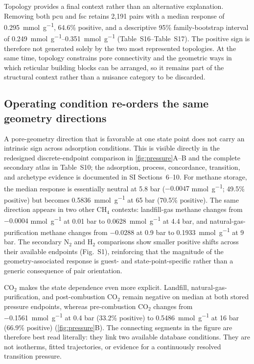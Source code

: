 \documentclass[11pt,a4paper]{article}
\newcommand{\SIfig}[1]{Fig.~S#1}
\newcommand{\SItab}[1]{Table~S#1}
\newcommand{\SIsecs}[1]{SI Sections~#1}
\begin{document}
Topology provides a final context rather than an alternative explanation.
Removing both pcu and fsc retains 2,191 pairs with a median response of
\SI{0.295}{\milli\mole\per\gram}, 64.6\% positive, and a descriptive 95\%
family-bootstrap interval of
\SIrange{0.249}{0.351}{\milli\mole\per\gram} (\SItab{16}--\SItab{17}).
The positive sign is therefore not generated solely by the two most represented
topologies. At the same time, topology constrains pore connectivity and the
geometric ways in which reticular building blocks can be arranged, so it remains
part of the structural context rather than a nuisance category to be discarded.

\subsection{Operating condition re-orders the same geometry directions}

A pore-geometry direction that is favorable at one state point does not carry an
intrinsic sign across adsorption conditions. This is visible directly in the
redesigned discrete-endpoint comparison in \cref{fig:pressure}A--B and the complete
secondary atlas in \SItab{10}; the adsorption, process, concordance, transition,
and archetype evidence is documented in \SIsecs{6--10}. For methane storage, the median response is
essentially neutral at 5.8 bar
($-0.0047$ \si{\milli\mole\per\gram}; 49.5\% positive) but becomes
\SI{0.5836}{\milli\mole\per\gram} at 65 bar (70.5\% positive). The same direction
appears in two other CH$_4$ contexts: landfill-gas methane changes from
$-0.0004$ \si{\milli\mole\per\gram} at 0.01 bar to
\SI{0.0628}{\milli\mole\per\gram} at 4.4 bar, and natural-gas-purification
methane changes from $-0.0288$ at 0.9 bar to
\SI{0.1933}{\milli\mole\per\gram} at 9 bar. The secondary N$_2$ and H$_2$
comparisons show smaller positive shifts across their available endpoints
(\SIfig{1}), reinforcing that the magnitude of the geometry-associated response is
guest- and state-point-specific rather than a generic consequence of pair
orientation.

CO$_2$ makes the state dependence even more explicit. Landfill,
natural-gas-purification, and post-combustion CO$_2$ remain negative on median at
both stored pressure endpoints, whereas pre-combustion CO$_2$ changes from
\SI{-0.1561}{\milli\mole\per\gram} at 0.4 bar (33.2\% positive) to
\SI{0.5486}{\milli\mole\per\gram} at 16 bar (66.9\% positive)
(\cref{fig:pressure}B). The connecting segments in the figure are therefore best
read literally: they link two available database conditions. They are not
isotherms, fitted trajectories, or evidence for a continuously resolved transition
pressure.
\end{document}
